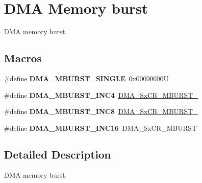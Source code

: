 \hypertarget{group___d_m_a___memory__burst}{}\section{D\+MA Memory burst}
\label{group___d_m_a___memory__burst}


D\+MA memory burst.  


\subsection*{Macros}
\begin{DoxyCompactItemize}
\item 
\mbox{\label{group___d_m_a___memory__burst_ga4e94b7250e6a4f53d702b42b15796953}} 
\#define {\bfseries D\+M\+A\+\_\+\+M\+B\+U\+R\+S\+T\+\_\+\+S\+I\+N\+G\+LE}~0x00000000U
\item 
\mbox{\label{group___d_m_a___memory__burst_gac9efcb13b2f0a715edb931dde213c000}} 
\#define {\bfseries D\+M\+A\+\_\+\+M\+B\+U\+R\+S\+T\+\_\+\+I\+N\+C4}~\mbox{\hyperlink{group___peripheral___registers___bits___definition_ga1e3931a8f14ffe008b8717e1b3232fca}{D\+M\+A\+\_\+\+Sx\+C\+R\+\_\+\+M\+B\+U\+R\+S\+T\+\_}}
\item 
\mbox{\label{group___d_m_a___memory__burst_ga4b8834930bb3b93cd3fcf04660b6933d}} 
\#define {\bfseries D\+M\+A\+\_\+\+M\+B\+U\+R\+S\+T\+\_\+\+I\+N\+C8}~\mbox{\hyperlink{group___peripheral___registers___bits___definition_gaf28eac7212392083bbf1b3d475022b74}{D\+M\+A\+\_\+\+Sx\+C\+R\+\_\+\+M\+B\+U\+R\+S\+T\+\_}}
\item 
\mbox{\label{group___d_m_a___memory__burst_ga7812aea620b09c4f4281d614d86e6094}} 
\#define {\bfseries D\+M\+A\+\_\+\+M\+B\+U\+R\+S\+T\+\_\+\+I\+N\+C16}~D\+M\+A\+\_\+\+Sx\+C\+R\+\_\+\+M\+B\+U\+R\+ST
\end{DoxyCompactItemize}


\subsection{Detailed Description}
D\+MA memory burst. 

